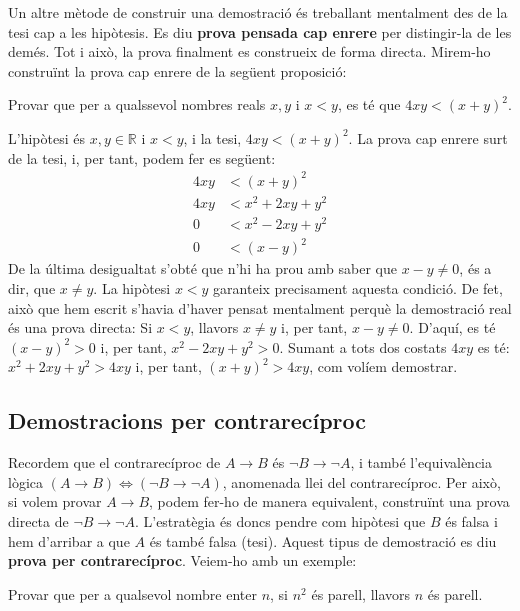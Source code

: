 Un altre mètode de construir una demostració és treballant
mentalment des de la tesi cap a les hipòtesis. Es diu \textbf{prova
pensada cap enrere} per distingir-la de les demés. Tot i això, la
prova finalment es construeix de forma directa. Mirem-ho construïnt la
prova cap enrere de la següent proposició:

\begin{exemple}
Provar que per a qualssevol nombres reals $x,y$ i $x<y$, es té que $4xy<(x+y)^{2}$.
\end{exemple}

\begin{solucio}
L'hipòtesi és $x,y\in\mathbb{R}$ i $x<y$, i la tesi, $4xy<(x+y)^{2}$. La prova cap enrere surt de la tesi, i, per tant, podem fer es següent:\begin{align*}
4xy & <(x+y)^{2} \\
4xy & <x^{2}+2xy+y^{2} \\
0 & <x^{2}-2xy+y^{2} \\
0 & <(x-y)^{2}
\end{align*}
De la última desigualtat s'obté que n'hi ha prou amb saber que
$x-y\neq0$, és a dir, que $x\neq y$. La hipòtesi $x<y$ garanteix
precisament aquesta condició. De fet, això que hem escrit s'havia
d'haver pensat mentalment perquè la demostració real és una prova
directa: Si $x<y$, llavors $x\neq y$ i, per tant, $x-y\neq0$. D'aquí,
es té $(x-y)^{2}>0$ i, per tant, $x^{2}-2xy+y^{2}>0$. Sumant a tots dos
costats $4xy$ es té: $x^{2}+2xy+y^{2}>4xy$ i, per tant, $(x+y)^{2}>4xy$,
com volíem demostrar.
\end{solucio}

\subsection{Demostracions per contrarecíproc}

Recordem que el contrarecíproc de $A\longrightarrow B$ és $\lnot
B\longrightarrow\lnot A$, i també l'equivalència lògica $\left(
A\longrightarrow B\right) \Longleftrightarrow\left( \lnot B\longrightarrow
\lnot A\right) $, anomenada llei del contrarecíproc. Per això, si
volem provar $A\longrightarrow B$, podem fer-ho de manera equivalent, construïnt una prova directa de $\lnot B\longrightarrow\lnot A$. L'estratègia és doncs pendre com hipòtesi que $B$ és falsa i hem
d'arribar a que $A$ és també falsa (tesi). Aquest tipus de demostració es diu \textbf{prova per contrarecíproc}. Veiem-ho amb un exemple:

\begin{exemple}
\label{ex:n2-parell}Provar que per a qualsevol nombre enter $n$, si $n^{2}$ és
parell, llavors $n$ és parell.
\end{exemple}

